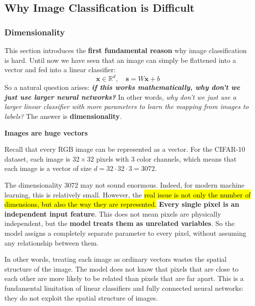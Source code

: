 \subsection{Why Image Classification is Difficult}\label{sec:why-image-classification-is-difficult}

\subsubsection{Dimensionality}\label{sec:dimensionality}

This section introduces the \textbf{first fundamental reason} why image classification is hard. Until now we have seen that an image can simply be flattened into a vector and fed into a linear classifier:
\begin{equation*}
    \mathbf{x} \in \mathbb{R}^{d}, \quad \mathbf{s} = W\mathbf{x} + b
\end{equation*}
So a natural question arises: \emph{\textbf{if this works mathematically, why don't we just use larger neural networks?}} In other words, \emph{why don't we just use a larger linear classifier with more parameters to learn the mapping from images to labels?} The answer is \textbf{dimensionality}.

\highspace
\begin{flushleft}
    \textcolor{Red2}{ \textbf{Images are huge vectors}}
\end{flushleft}
Recall that every RGB image can be represented as a vector. For the CIFAR-10 dataset, each image is $32 \times 32$ pixels with 3 color channels, which means that each image is a vector of size $d = 32 \cdot 32 \cdot 3 = 3072$.

\highspace
The dimensionality $3072$ may not sound enormous. Indeed, for modern machine learning, this is relatively small. However, the \hl{real issue is not only the number of dimensions, but also the way they are represented.} \textbf{Every single pixel is an independent input feature}. This does not mean pixels are physically independent, but the \textbf{model treats them as unrelated variables}. So the model assigns a completely separate parameter to every pixel, without assuming any relationship between them.

\highspace
In other words, treating each image as ordinary vectors wastes the spatial structure of the image. The model does not know that pixels that are close to each other are more likely to be related than pixels that are far apart. This is a fundamental limitation of linear classifiers and fully connected neural networks: they do not exploit the spatial structure of images.

